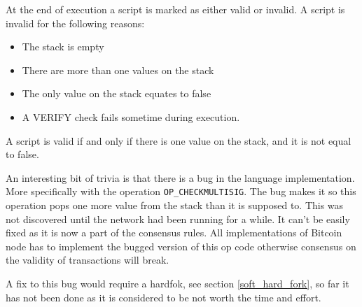 \label{script_valid}
At the end of execution a script is marked as either valid or invalid. A script is invalid for the following reasons:

\begin{itemize}
	\item The stack is empty
	\item There are more than one values on the stack
	\item The only value on the stack equates to false
	\item A VERIFY check fails sometime during execution.
\end{itemize}

A script is valid if and only if there is one value on the stack, and it is not equal to false.

An interesting bit of trivia is that there is a bug in the language implementation. More specifically with the operation \texttt{OP\_CHECKMULTISIG}. The bug makes it so this operation pops one more value from the stack than it is supposed to. This was not discovered until the network had been running for a while. It can't be easily fixed as it is now a part of the consensus rules. All implementations of Bitcoin node has to implement the bugged version of this op code otherwise consensus on the validity of transactions will break.

A fix to this bug would require a hardfok, see section \ref{soft_hard_fork}, so far it has not been done as it is considered to be not worth the time and effort.
